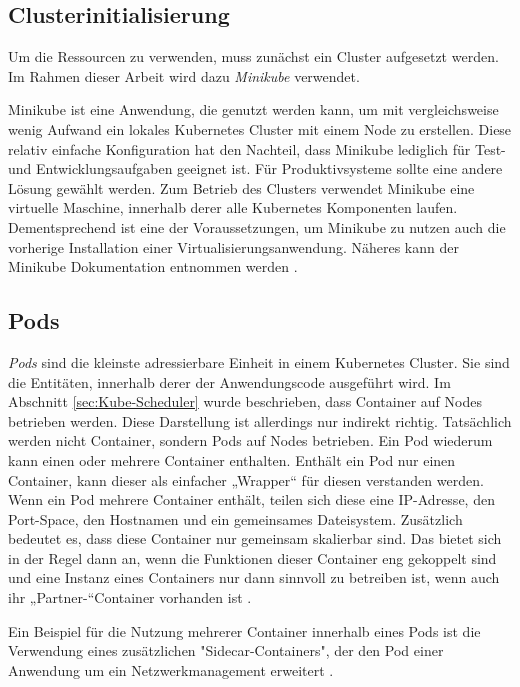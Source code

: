 \documentclass[11pt,a4paper]{article}
\begin{document}

\subsection{Clusterinitialisierung}
Um die Ressourcen zu verwenden, muss zunächst ein Cluster aufgesetzt werden.
Im Rahmen dieser Arbeit wird dazu \emph{Minikube} verwendet.

Minikube ist eine Anwendung, die genutzt werden kann, um mit vergleichsweise wenig Aufwand ein lokales
Kubernetes Cluster mit einem Node zu erstellen. Diese relativ einfache Konfiguration hat
den Nachteil, dass Minikube lediglich für Test- und Entwicklungsaufgaben geeignet ist.
Für Produktivsysteme sollte eine andere Lösung gewählt werden. %
Zum Betrieb des Clusters verwendet Minikube eine virtuelle Maschine, innerhalb derer
alle Kubernetes Komponenten laufen. Dementsprechend ist eine der Voraussetzungen,
um Minikube zu nutzen auch die vorherige Installation einer Virtualisierungsanwendung.
Näheres kann der Minikube Dokumentation entnommen werden \cite{minikube}.

\subsection{Pods}
\emph{Pods} sind die kleinste adressierbare Einheit in einem Kubernetes Cluster.
Sie sind die Entitäten, innerhalb derer der Anwendungscode ausgeführt wird.
Im Abschnitt \ref{sec:Kube-Scheduler} wurde beschrieben, dass Container auf Nodes betrieben werden.
Diese Darstellung ist allerdings nur indirekt richtig. Tatsächlich werden nicht Container,
sondern Pods auf Nodes betrieben.
Ein Pod wiederum kann einen oder mehrere Container enthalten. Enthält ein Pod nur einen Container,
kann dieser als einfacher „Wrapper“ für diesen verstanden werden.
Wenn ein Pod mehrere Container enthält, teilen sich diese eine IP-Adresse,
den Port-Space, den Hostnamen und ein gemeinsames Dateisystem.
Zusätzlich bedeutet es, dass diese Container nur gemeinsam skalierbar sind.
Das bietet sich in der Regel dann an, wenn die Funktionen dieser Container eng gekoppelt sind und eine Instanz eines
Containers nur dann sinnvoll zu betreiben ist, wenn auch ihr „Partner-“Container vorhanden ist \cite{9783969109625} \cite{Schmeling_Dargatz_2022}.

Ein Beispiel für die Nutzung mehrerer Container innerhalb eines Pods ist die Verwendung
eines zusätzlichen "Sidecar-Containers", der den Pod einer Anwendung um ein Netzwerkmanagement erweitert \cite{9783969109625}.
\end{document}
